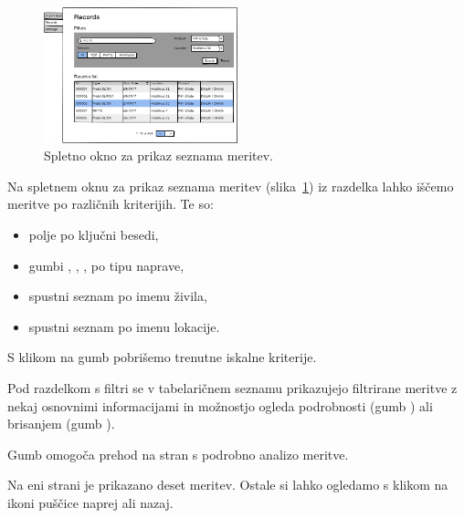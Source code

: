 \documentclass[a4paper, 12pt]{book}
\begin{document}
\begin{figure}[h]
\begin{center}
\includegraphics[width=0.5\textwidth]{slike/Records.png}
\end{center}
\caption{Spletno okno za prikaz seznama meritev.}
\label{records-wireframe}
\end{figure}

Na spletnem oknu za prikaz seznama meritev (slika~\ref{records-wireframe}) iz razdelka  lahko iščemo meritve po različnih kriterijih. Te so:
\begin{itemize}
	\item polje  po ključni besedi,
	\item gumbi , , ,  po tipu naprave,
	\item spustni seznam  po imenu živila,
	\item spustni seznam  po imenu lokacije.  
\end{itemize}

S klikom na gumb  pobrišemo trenutne iskalne kriterije.


Pod razdelkom s filtri se v tabelaričnem seznamu prikazujejo filtrirane meritve z nekaj osnovnimi informacijami in možnostjo ogleda podrobnosti (gumb ) ali brisanjem (gumb ).

Gumb  omogoča prehod na stran s podrobno analizo meritve.

Na eni strani je prikazano deset meritev. Ostale si lahko ogledamo s klikom na ikoni puščice naprej ali nazaj.

\clearpage
\end{document}
